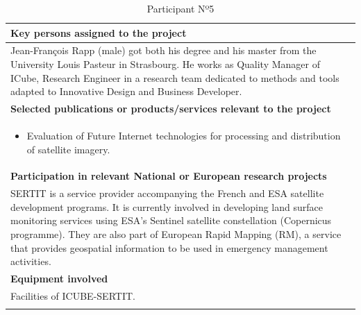 \begin{longtable}[H]{|p{0.7cm}|p{4cm}|p{7cm}|p{1.3cm}|}
	\multicolumn{4}{|p{13cm}|}{\textbf{Key persons assigned to the project}}   \\ \hline
	
	\multicolumn{4}{|p{14.5cm}|}{Jean-François Rapp (male) got both his degree and his master from the University Louis Pasteur in Strasbourg. He works as Quality Manager of ICube, Research Engineer in a research team dedicated to methods and tools adapted to Innovative Design and Business Developer.  } \\ \hline
	
	\multicolumn{4}{|p{13cm}|}{\textbf{Selected publications or products/services relevant to the project}}  \\ \hline
	
	\multicolumn{4}{|p{14.5cm}|}{
		\begin{itemize} 
			\item Evaluation of Future Internet technologies for processing and distribution of satellite imagery.
		\end{itemize}}  \\ \hline
	
	\multicolumn{4}{|p{13cm}|}{\textbf{Participation in relevant National or European research projects}}  \\ \hline
	
	\multicolumn{4}{|p{14.5cm}|}{SERTIT is a service provider accompanying the French and ESA satellite development programs. It is currently involved in developing land surface monitoring services using ESA's Sentinel satellite constellation (Copernicus programme). They are also part of European Rapid Mapping (RM), a service that provides geospatial information to be used in emergency management activities.}  \\ \hline
	
	\multicolumn{4}{|p{13cm}|}{\textbf{Equipment involved}}  \\ \hline
	
	\multicolumn{4}{|p{14.5cm}|}{Facilities of ICUBE-SERTIT.}  \\ \hline
	\caption{Participant Nº5}
\end{longtable}



